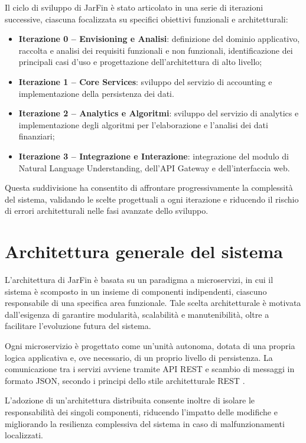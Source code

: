 Il ciclo di sviluppo di JarFin è stato articolato in una serie di iterazioni successive, ciascuna focalizzata su specifici obiettivi funzionali e architetturali:

\begin{itemize}
    \item \textbf{Iterazione 0 – Envisioning e Analisi}: definizione del dominio applicativo, raccolta e analisi dei requisiti funzionali e non funzionali, identificazione dei principali casi d’uso e progettazione dell’architettura di alto livello;
    \item \textbf{Iterazione 1 – Core Services}: sviluppo del servizio di accounting e implementazione della persistenza dei dati.
    \item \textbf{Iterazione 2 – Analytics e Algoritmi}: sviluppo del servizio di analytics e implementazione degli algoritmi per l’elaborazione e l’analisi dei dati finanziari;
    \item \textbf{Iterazione 3 – Integrazione e Interazione}: integrazione del modulo di Natural Language Understanding, dell’API Gateway e dell’interfaccia web.
\end{itemize}

Questa suddivisione ha consentito di affrontare progressivamente la complessità del sistema, validando le scelte progettuali a ogni iterazione e riducendo il rischio di errori architetturali nelle fasi avanzate dello sviluppo.

\section{Architettura generale del sistema}

L’architettura di JarFin è basata su un paradigma a microservizi, in cui il sistema è scomposto in un insieme di componenti indipendenti, ciascuno responsabile di una specifica area funzionale. Tale scelta architetturale è motivata dall’esigenza di garantire modularità, scalabilità e manutenibilità, oltre a facilitare l’evoluzione futura del sistema.

Ogni microservizio è progettato come un’unità autonoma, dotata di una propria logica applicativa e, ove necessario, di un proprio livello di persistenza. La comunicazione tra i servizi avviene tramite API REST e scambio di messaggi in formato JSON, secondo i principi dello stile architetturale REST \cite{fieldingRest}.

L’adozione di un’architettura distribuita consente inoltre di isolare le responsabilità dei singoli componenti, riducendo l’impatto delle modifiche e migliorando la resilienza complessiva del sistema in caso di malfunzionamenti localizzati.

